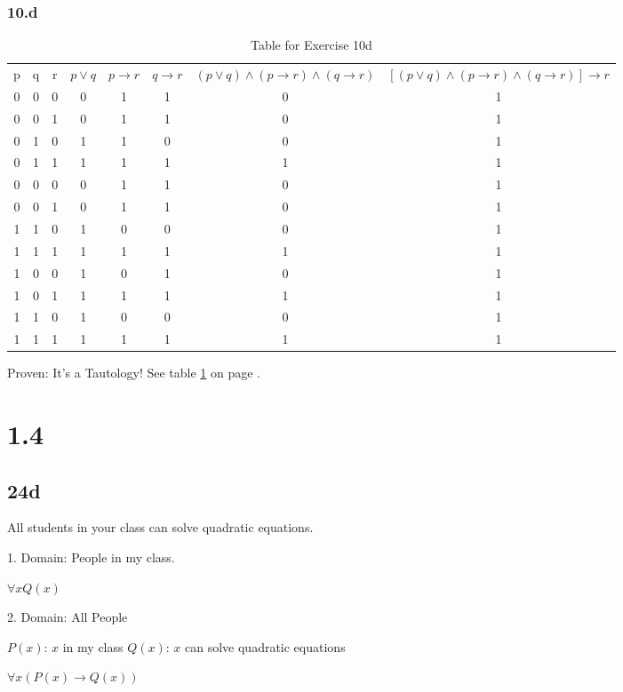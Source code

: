 \documentclass[12pt]{article}
\begin{document}
\subsubsection{10.d}
\begin{table}[p]
  \begin{tabular}{cccccccc}
    p& q& r& $p\vee q$& $p\rightarrow r$& $q\rightarrow r$& $(p\vee q) \wedge (p\rightarrow r) \wedge (q\rightarrow r)$&$[(p\vee q) \wedge (p\rightarrow r) \wedge (q\rightarrow r)] \rightarrow r $ \\
    0& 0& 0& 0& 1& 1 &0 &1 \\
    0& 0& 1& 0& 1& 1 &0 &1 \\
    0& 1& 0& 1& 1& 0 &0 &1 \\
    0& 1& 1& 1& 1& 1 &1 &1 \\
    0& 0& 0& 0& 1& 1 &0 &1 \\
    0& 0& 1& 0& 1& 1 &0 &1 \\
    1& 1& 0& 1& 0& 0 &0 &1 \\
    1& 1& 1& 1& 1& 1 &1 &1 \\
    1& 0& 0& 1& 0& 1 &0 &1 \\
    1& 0& 1& 1& 1& 1 &1 &1 \\
    1& 1& 0& 1& 0& 0 &0 &1 \\
    1& 1& 1& 1& 1& 1 &1 &1
  \end{tabular}
  \caption{Table for Exercise 10d}
  \label{table:10d}
\end{table}

Proven: It's a Tautology! See table \ref{table:10d} on page \pageref{table:10d}.

\section{1.4}
\subsection{24d}
All students in your class can solve quadratic equations.

1. Domain: People in my class.

\begin{math}
  \forall{x} Q(x)
\end{math}

2. Domain: All People

$P(x)$: $x$ in my class
$Q(x)$: $x$ can solve quadratic equations

\begin{math}
  \forall{x}(P(x)\rightarrow Q(x))
\end{math}
\end{document}
